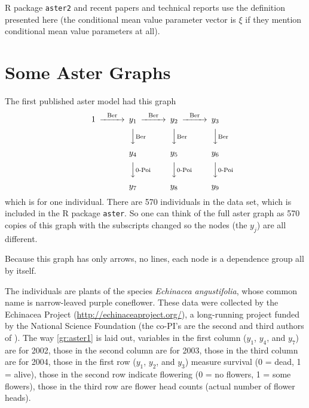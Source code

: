 R package \texttt{aster2} and recent papers and technical reports use
the definition presented here (the conditional mean value parameter vector
is $\xi$ if they mention conditional mean value parameters at all).

\section{Some Aster Graphs}
\label{sec:graphs}

The first published aster model \citep{aster1} had this graph
\begin{equation} \label{gr:aster1}
\begin{CD}
   1
   @>\text{Ber}>>
   y_1
   @>\text{Ber}>>
   y_2
   @>\text{Ber}>>
   y_3
   \\
   @.
   @VV\text{Ber}V
   @VV\text{Ber}V
   @VV\text{Ber}V
   \\
   \hphantom{1}
   @.
   y_4
   @.
   y_5
   @.
   y_6
   \\
   @.
   @VV\text{0-Poi}V
   @VV\text{0-Poi}V
   @VV\text{0-Poi}V
  \\
   \hphantom{1}
   @.
   y_7
   @.
   y_8
   @.
   y_9
\end{CD}
\end{equation}
which is for one individual.  There are 570 individuals in the data set,
which is included in the R package \texttt{aster}.  So one can think of the
full aster graph as 570 copies of this graph with the subscripts changed
so the nodes (the $y_j$) are all different.

Because this graph has only arrows, no lines, each node is
a dependence group all by itself.

The individuals are plants of the species \emph{Echinacea angustifolia},
whose common name is narrow-leaved
purple coneflower.  These data were collected by the Echinacea Project
(\url{http://echinaceaproject.org/}), a long-running project funded by
the National Science Foundation (the co-PI's are the second and third authors
of \citet{aster1}).  The way \eqref{gr:aster1} is laid out,
variables in the first column ($y_1$, $y_4$, and $y_7$) are for 2002,
those in the second column are for 2003,
those in the third column are for 2004,
those in the first row ($y_1$, $y_2$, and $y_3$) measure survival
(0 = dead, 1 = alive),
those in the second row indicate flowering
(0 = no flowers, 1 = some flowers),
those in the third row are flower head counts
(actual number of flower heads).

